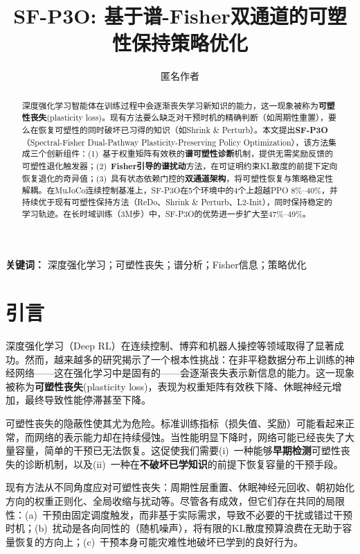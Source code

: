 \documentclass[twocolumn]{article}
\title{\textbf{SF-P3O: 基于谱-Fisher双通道的可塑性保持策略优化}}
\author{
  匿名作者
}
\date{}
\begin{document}
\maketitle

\begin{abstract}
深度强化学习智能体在训练过程中会逐渐丧失学习新知识的能力，这一现象被称为\textbf{可塑性丧失}(plasticity loss)。现有方法要么缺乏对干预时机的精确判断（如周期性重置），要么在恢复可塑性的同时破坏已习得的知识（如Shrink \& Perturb）。本文提出\textbf{SF-P3O}（Spectral-Fisher Dual-Pathway Plasticity-Preserving Policy Optimization），该方法集成三个创新组件：(1)~基于权重矩阵有效秩的\textbf{谱可塑性诊断}机制，提供无需奖励反馈的可塑性退化触发器；(2)~\textbf{Fisher引导的谱扰动}方法，在可证明约束KL散度的前提下定向恢复退化的奇异值；(3)~具有状态依赖门控的\textbf{双通道架构}，将可塑性恢复与策略稳定性解耦。在MuJoCo连续控制基准上，SF-P3O在5个环境中的4个上超越PPO 8\%--40\%，并持续优于现有可塑性保持方法（ReDo、Shrink \& Perturb、L2-Init），同时保持稳定的学习轨迹。在长时域训练（3M步）中，SF-P3O的优势进一步扩大至47\%--49\%。
\end{abstract}

\textbf{关键词：} 深度强化学习；可塑性丧失；谱分析；Fisher信息；策略优化


\section{引言}
\label{sec:intro}

深度强化学习（Deep RL）在连续控制\cite{schulman2017ppo,haarnoja2018sac}、博弈\cite{silver2017mastering}和机器人操控\cite{levine2016end}等领域取得了显著成功。然而，越来越多的研究揭示了一个根本性挑战：在非平稳数据分布上训练的神经网络——这在强化学习中是固有的——会逐渐丧失表示新信息的能力\cite{lyle2023understanding,dohare2024loss,kumar2020implicit}。这一现象被称为\textbf{可塑性丧失}(plasticity loss)，表现为权重矩阵有效秩下降、休眠神经元增加，最终导致性能停滞甚至下降。

可塑性丧失的隐蔽性使其尤为危险。标准训练指标（损失值、奖励）可能看起来正常，而网络的表示能力却在持续侵蚀。当性能明显下降时，网络可能已经丧失了大量容量，简单的干预已无法恢复。这促使我们需要(i)~一种能够\textbf{早期检测}可塑性丧失的诊断机制，以及(ii)~一种在\textbf{不破坏已学知识}的前提下恢复容量的干预手段。

现有方法从不同角度应对可塑性丧失：周期性层重置\cite{nikishin2022primacy}、休眠神经元回收\cite{sokar2023dormant}、朝初始化方向的权重正则化\cite{kumar2023maintaining}、全局收缩与扰动\cite{ash2020warm}等。尽管各有成效，但它们存在共同的局限性：(a)~干预由固定调度触发，而非基于实际需求，导致不必要的干扰或错过干预时机；(b)~扰动是各向同性的（随机噪声），将有限的KL散度预算浪费在无助于容量恢复的方向上；(c)~干预本身可能灾难性地破坏已学到的良好行为。
\end{document}
